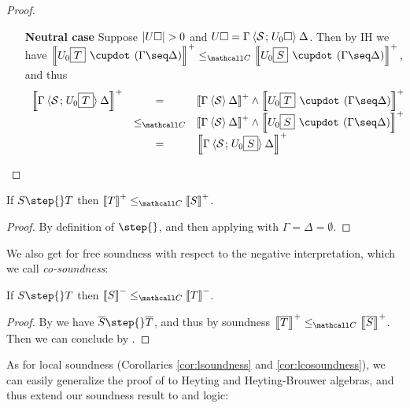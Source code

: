 \begin{proof}
\begin{itemize}
    \item[\textbf{Neutral case}] Suppose $\left|U\square\right| > 0$ and $U\square =
    \Gamma \mathbin{\langle \mathcal{S} \;\!;\!\; U_0\square \rangle} \Delta$. Then by IH we have
    $\psint{U_0\select{T} \mix (\Gamma \seq \Delta)} \sementC
    \psint{U_0\select{S} \mix (\Gamma \seq \Delta)}$, and thus
    $$
    \begin{array}{rcll}
      \psint{\Gamma \piq{\cS \sep U_0\select{T}} \Delta}
      &=& \psint{\Gamma \piq{\cS} \Delta} \land \psint{U_0\select{T} \mix (\Gamma \seq \Delta)} &\\
      &\sementC& \psint{\Gamma \piq{\cS} \Delta} \land \psint{U_0\select{S} \mix (\Gamma \seq \Delta)} &\\
      &=& \psint{\Gamma \piq{\cS \sep U_0\select{S}} \Delta} &
    \end{array}
    $$
  \end{itemize}
\end{proof}

\begin{theorem}[Soundness]
  If $S \step{} T$ then $\psint{T} \sementC \psint{S}$.
\end{theorem}
\begin{proof}
  By definition of $\step{}$, and then applying 
  with $\Gamma = \Delta = \emptyset$.
\end{proof}

We also get for free soundness with respect to the negative interpretation,
which we call \emph{co-soundness}:

\begin{theorem}[Co-soundness]
  If $S \step{} T$ then $\nsint{S} \sementC \nsint{T}$.
\end{theorem}
\begin{proof}
  By  we have $\soldual{S} \step{} \soldual{T}$,
  and thus by soundness $\psint{\soldual{T}} \sementC \psint{\soldual{S}}$. Then
  we can conclude by .
\end{proof}

As for local soundness (Corollaries \ref{cor:lsoundness} and
\ref{cor:lcosoundness}), we can easily generalize the proof of
 to Heyting and Heyting-Brouwer algebras, and
thus extend our soundness result to  and  logic:

